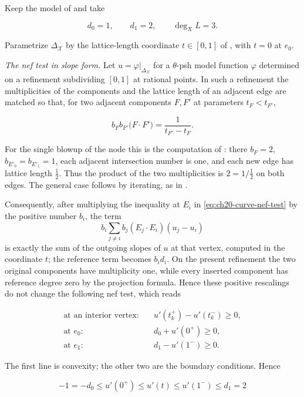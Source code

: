 \begin{example}
\label{ex:ch22-modulus-segment}
Keep the model of  and take

\[
              d_0=1,\qquad d_1=2,\qquad \deg_XL=3 .
\]

Parametrize $\Delta_{\mathcal X}$ by the lattice-length coordinate
$t\in[0,1]$ of , with $t=0$ at
$e_0$.

\emph{The nef test in slope form.}  Let $u=\varphi|_{\Delta_{\mathcal X}}$
for a $\theta$-psh model function $\varphi$ determined on a refinement
subdividing $[0,1]$ at rational points.  In such a refinement the
multiplicities of the components and the lattice length of an adjacent edge
are matched so that, for two adjacent components $F,F'$ at parameters
$t_F<t_{F'}$,

\[
 b_Fb_{F'}\bigl(F\cdot F'\bigr)=\frac1{t_{F'}-t_F} .
\]

For the single blowup of the node this is the computation of
: there $b_F=2$,
$b_{E'_0}=b_{E'_1}=1$, each adjacent intersection number is one, and
each new edge has lattice length $\tfrac12$.  Thus the product of the two
multiplicities is $2=1/\tfrac12$ on both edges.  The general case follows
by iterating, as in .

Consequently, after multiplying the inequality at $E_i$ in
\eqref{eq:ch20-curve-nef-test} by the positive number $b_i$, the term
\[
 b_i\sum_{j\neq i}b_j(E_j\cdot E_i)(u_j-u_i)
\]
is exactly the sum of the outgoing slopes of $u$ at that vertex, computed
in the coordinate $t$; the reference term becomes $b_id_i$.  On the
present refinement the two original components have multiplicity one, while
every inserted component has reference degree zero by the projection
formula.  Hence these positive rescalings do not change the following nef
test, which reads

\[
 \begin{aligned}
 \text{at an interior vertex:}&\quad
   u'(t_k^+)-u'(t_k^-)\geq0,\\
 \text{at }e_0:&\quad d_0+u'(0^+)\geq0,\\
 \text{at }e_1:&\quad d_1-u'(1^-)\geq0 .
 \end{aligned}
\tag{22.56}\label{eq:ch22-curve-slope-form}
\]

The first line is convexity; the other two are the boundary conditions.
Hence

\[
 -1=-d_0\leq u'(0^+)\leq u'(t)\leq u'(1^-)\leq d_1=2
\]


\end{example}
